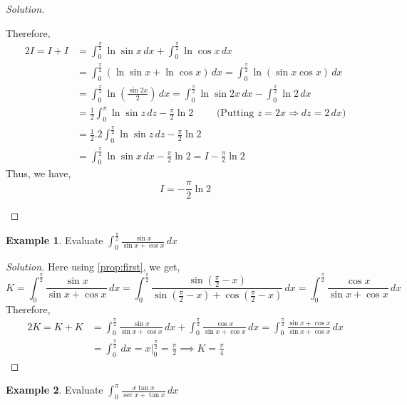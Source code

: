 \documentclass{book}
\theoremstyle{definition}
\newtheorem{example}{Example}[section]
\newenvironment{solution}
    {\begin{proof}[Solution]}
    {\end{proof}}
\begin{document}
\begin{solution}
\begin{enumerate}[label=(\roman*)]
Therefore, 
\begin{align*}
    2I = I+I &= \int_0^{\frac{\pi}{2}}\ln \sin x\,dx + \int_0^{\frac{\pi}{2}}\ln \cos x\,dx \\
    &= \int_0^{\frac{\pi}{2}}(\ln \sin x+\ln \cos x)\,dx = \int_0^{\frac{\pi}{2}}\ln (\sin x\cos x)\,dx \\
    &= \int_0^{\frac{\pi}{2}}\ln \left(\frac{\sin 2x}{2}\right)\,dx = \int_0^{\frac{\pi}{2}}\ln\sin2x\,dx- \displaystyle\int_0^{\frac{\pi}{2}}\ln 2\,dx \\
    &= \frac{1}{2}\int_0^{\pi}\ln \sin z\,dz-\frac{\pi}{2}\ln 2 \qquad \text{ (Putting $z=2x \Rightarrow dz = 2\,dx$)} \\
    &= \frac{1}{2}.2\displaystyle\int_0^\frac{\pi}{2}\ln \sin z\,dz-\frac{\pi}{2}\ln 2 \\
    &= \int_0^\frac{\pi}{2}\ln \sin x\,dx-\frac{\pi}{2}\ln 2 = I-\frac{\pi}{2}\ln 2
\end{align*}
Thus, we have,
\[
I = -\frac{\pi}{2}\ln 2
\]

\end{enumerate}
\end{solution}

\pagebreak

\begin{example}
Evaluate $\displaystyle\int_0^{\frac{\pi}{2}}\frac{\sin x}{\sin x+\cos x}\,dx$    
\end{example}

\begin{solution}
Here using \ref{prop:first}, we get,
\[
K=\displaystyle\int_0^{\frac{\pi}{2}}\frac{\sin x}{\sin x+\cos x}\,dx = \int_0^{\frac{\pi}{2}}\frac{\sin \left(\frac{\pi}{2}-x\right)}{\sin \left(\frac{\pi}{2}-x\right)+\cos (\frac{\pi}{2}-x)}\,dx = \int_0^{\frac{\pi}{2}}\frac{\cos x}{\sin x+\cos x}\,dx
\]
Therefore,
\begin{align*}
    2K = K+K &= \int_0^{\frac{\pi}{2}}\frac{\sin x}{\sin x+\cos x}\,dx+\int_0^{\frac{\pi}{2}}\frac{\cos x}{\sin x+\cos x}\,dx=\int_0^{\frac{\pi}{2}}\frac{\sin x+\cos x}{\sin x+\cos x}\,dx \\
    &= \int_0^{\frac{\pi}{2}}\,dx =\left.x\right\vert _0^{\frac{\pi}{2}}=\frac{\pi}{2} \implies K = \frac{\pi}{4}
\end{align*}
\end{solution}


\begin{example}
Evaluate $\displaystyle\int_0^{\pi}\frac{x\tan x}{\sec x+\tan x}\,dx$    
\end{example}
\end{document}
